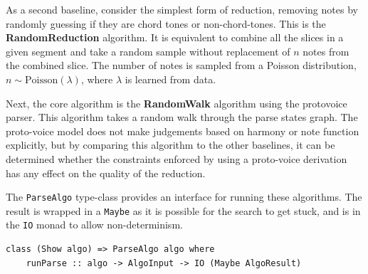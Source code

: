 \documentclass[12pt,a4paper,twoside,openany]{report} \usepackage[pdfborder={0 0 0}]{hyperref}    %
\theoremstyle{definition} \newtheorem{definition}{Definition}[section]
\begin{document}
As a second baseline, consider the simplest form of reduction, removing notes by randomly guessing if they are chord
tones or non-chord-tones. This is the \textbf{RandomReduction} algorithm. It is equivalent to combine all the slices in
a given segment and take a random sample without replacement of $n$ notes from the combined slice. The number of notes
is sampled from a Poisson distribution, $n \sim \text{Poisson}(\lambda)$, where $\lambda$ is learned from data. 

Next, the core algorithm is the \textbf{RandomWalk} algorithm using the protovoice parser. This algorithm takes a random
walk through the parse states graph. The proto-voice model does not make judgements based on harmony or note function
explicitly, but by comparing this algorithm to the other baselines, it can be determined whether the constraints
enforced by using a proto-voice derivation has any effect on the quality of the reduction. 

The \texttt{ParseAlgo} type-class provides an interface for running these algorithms. The result is wrapped in
a \texttt{Maybe} as it is possible for the search to get stuck, and is in the \texttt{IO} monad to allow
non-determinism.

\begin{lstlisting}[caption={Algorithm type-class}, captionpos=b] 
  class (Show algo) => ParseAlgo algo where 
    runParse :: algo -> AlgoInput -> IO (Maybe AlgoResult) 
\end{lstlisting}
\end{document}

